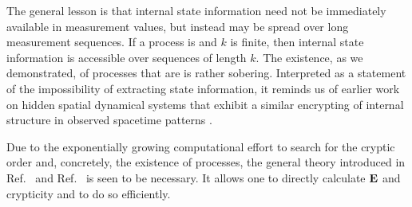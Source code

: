 The general lesson is that internal state information need not be immediately
available in measurement values, but instead may be spread over long measurement
sequences. If a process is  and $k$ is finite, then internal state
information is accessible over sequences of length $k$. The
existence, as we demonstrated, of processes that are \cryptic{\infty} is rather
sobering. Interpreted as a statement of the impossibility of extracting state
information, it reminds us of earlier work on hidden spatial dynamical systems
that exhibit a similar encrypting of internal structure in observed spacetime
patterns \cite{Crut91e}.

Due to the exponentially growing computational effort to search for the
cryptic order and, concretely, the existence of \cryptic{\infty} processes,
the general theory introduced in Ref.~\cite{Crut08a} and Ref.~\cite{Crut08b} is
seen to be necessary. It allows one to directly calculate ${\bf E}$ and crypticity
and to do so efficiently.


\ifx\master\undefined\fi
